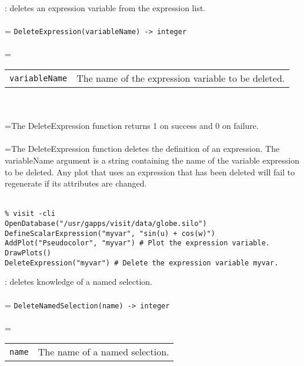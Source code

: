\documentclass[10pt,a4paper]{report}
\begin{document}
{}
: deletes an expression variable from the expression list.\\[-3mm]

 \\ 
\hangindent=\parindent 
\verb!DeleteExpression(variableName) -> integer!\\ [-3mm]

 \\ 
\hangindent=\parindent 
\begin{tabular}{lp{9cm}}
\verb!variableName! & The name of the expression variable to be deleted. \\
\end{tabular} \\[-2mm]


 \\ 
\hangindent=\parindent The DeleteExpression function returns 1 on success and 0 on failure. \\[-3mm] 

 \\ 
\hangindent=\parindent The DeleteExpression function deletes the definition of an expression. The variableName argument is a string containing the name of the variable expression to be deleted. Any plot that uses an expression that has been deleted will fail to regenerate if its attributes are changed. \\[-3mm] 

\\[-6mm]
\begin{verbatim}% visit -cli
OpenDatabase("/usr/gapps/visit/data/globe.silo")
DefineScalarExpression("myvar", "sin(u) + cos(w)")
AddPlot("Pseudocolor", "myvar") # Plot the expression variable.
DrawPlots()
DeleteExpression("myvar") # Delete the expression variable myvar.
\end{verbatim}
\newpage


{}
: deletes knowledge of a named selection.\\[-3mm]

 \\ 
\hangindent=\parindent 
\verb!DeleteNamedSelection(name) -> integer!\\ [-3mm]

 \\ 
\hangindent=\parindent 
\begin{tabular}{ll}
\verb!name! & The name of a named selection. \\
\end{tabular} \\[-2mm]
\end{document}
